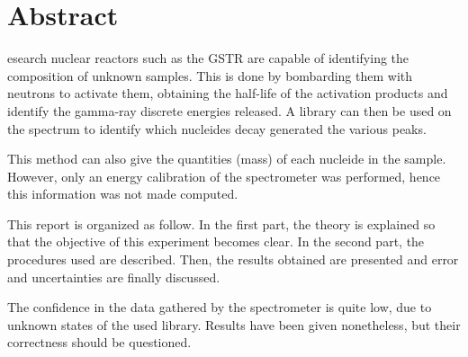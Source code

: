 %
%
%

\chapter*{Abstract}
\begin{SingleSpace}
esearch nuclear reactors such as the GSTR are capable of identifying the composition of unknown samples. This is done by bombarding them with neutrons to activate them, obtaining the half-life of the activation products and identify the gamma-ray discrete energies released. A library can then be used on the spectrum to identify which nucleides decay generated the various peaks.

This method can also give the quantities (mass) of each nucleide in the sample. However, only an energy calibration of the spectrometer was performed, hence this information was not made computed.

This report is organized as follow. In the first part, the theory is explained so that the objective of this experiment becomes clear. In the second part, the procedures used are described. Then, the results obtained are presented and error and uncertainties are finally discussed.

The confidence in the data gathered by the spectrometer is quite low, due to unknown states of the used library. Results have been given nonetheless, but their correctness should be questioned.
\end{SingleSpace}
\clearpage
